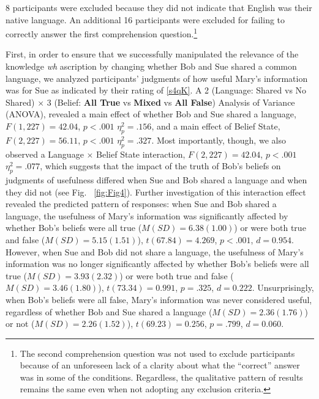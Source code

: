 \documentclass[a4paper]{article}
\begin{document}
8 participants were excluded because they did not indicate that English was their native language. An additional 16 participants were excluded for failing to correctly answer the first comprehension question.\footnote{The second comprehension question was not used to exclude participants because of an unforeseen lack of a clarity about what the ``correct'' answer was in some of the conditions. Regardless, the qualitative pattern of results remains the same even when not adopting any exclusion criteria.}

First, in order to ensure that we successfully manipulated the relevance of the knowledge \textit{wh} ascription by changing whether Bob and Sue shared a common language, we analyzed participants' judgments of how useful Mary's information was for Sue as indicated by their rating of \ref{s4qK}. A 2 (Language: Shared vs No Shared) $\times$ 3 (Belief: \textbf{All True} vs \textbf{Mixed} vs \textbf{All False}) Analysis of Variance (ANOVA), revealed a main effect of whether Bob and Sue shared a language, $F(1,227) = 42.04$, $p < .001$ $\eta_{p}^{2} = .156$, and a main effect of Belief State, $F(2,227) = 56.11$, $p < .001$ $\eta_{p}^{2} = .327$. Most importantly, though, we also observed a Language $\times$ Belief State interaction, $F(2,227) = 42.04$, $p < .001$ $\eta_{p}^{2} = .077$, which suggests that the impact of the truth of Bob's beliefs on judgments of usefulness differed when Sue and Bob shared a language and when they did not (see Fig. ~\ref{fig:Fig4}). Further investigation of this interaction effect revealed the predicted pattern of responses: when Sue and Bob shared a language, the usefulness of Mary's information was significantly affected by whether Bob's beliefs were all true (${M}({SD}) = 6.38(1.00)$) or were both true and false (${M}({SD}) = 5.15(1.51)$), $t(67.84) = 4.269$, $p < .001$, $d = 0.954$. However, when Sue and Bob did not share a language, the usefulness of Mary's information was no longer significantly affected by whether Bob's beliefs were all true (${M}({SD}) = 3.93(2.32)$) or were both true and false (${M}({SD}) = 3.46(1.80)$), $t(73.34) = 0.991$, $p = .325$, $d = 0.222$. Unsurprisingly, when Bob's beliefs were all false, Mary's information was never considered useful, regardless of whether Bob and Sue shared a language (${M}({SD}) = 2.36(1.76)$) or not (${M}({SD}) = 2.26(1.52)$), $t(69.23) = 0.256$, $p = .799$, $d = 0.060$.
\end{document}
